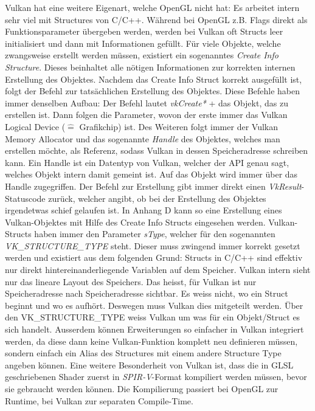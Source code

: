 \documentclass[titlepage, 11pt, a4paper, ngerman]{article}
\begin{document}
Vulkan hat eine weitere Eigenart, welche \acrshort{OpenGL} nicht hat: Es arbeitet intern sehr viel mit Structures von C/C++. Während bei \acrshort{OpenGL} z.B. Flags direkt als Funktionsparameter übergeben werden, werden bei Vulkan oft Structs leer initialisiert und dann mit Informationen gefüllt. Für viele Objekte, welche zwangsweise erstellt werden müssen, existiert ein sogenanntes \textit{Create Info Structure}. Dieses beinhaltet alle nötigen Informationen zur korrekten internen Erstellung des Objektes. Nachdem das Create Info Struct korrekt ausgefüllt ist, folgt der Befehl zur tatsächlichen Erstellung des Objektes. Diese Befehle haben immer denselben Aufbau: Der Befehl lautet \textit{vkCreate*} + das Objekt, das zu erstellen ist. Dann folgen die Parameter, wovon der erste immer das Vulkan Logical Device ($\widehat{=}$ Grafikchip) ist. Des Weiteren folgt immer der Vulkan Memory Allocator und das sogenannte \textit{Handle} des Objektes, welches man erstellen möchte, als Referenz, sodass Vulkan in dessen Speicheradresse schreiben kann. Ein Handle ist ein Datentyp von Vulkan, welcher der \acrshort{API} genau sagt, welches Objekt intern damit gemeint ist.  Auf das Objekt wird immer über das Handle zugegriffen. Der Befehl zur Erstellung gibt immer direkt einen \textit{VkResult}-Statuscode zurück, welcher angibt, ob bei der Erstellung des Objektes irgendetwas schief gelaufen ist. In Anhang D kann so eine Erstellung eines Vulkan-Objektes mit Hilfe des Create Info Structs eingesehen werden. Vulkan-Structs haben immer den Parameter \textit{sType}, welcher für den sogenannten \textit{VK\_STRUCTURE\_TYPE} steht. Dieser muss zwingend immer korrekt gesetzt werden und existiert aus dem folgenden Grund: Structs in C/C++ sind effektiv nur direkt hintereinanderliegende Variablen auf dem Speicher. Vulkan intern sieht nur das lineare Layout des Speichers. Das heisst, für Vulkan ist nur Speicheradresse nach Speicheradresse sichtbar. Es weiss nicht, wo ein Struct beginnt und wo es aufhört. Deswegen muss Vulkan dies mitgeteilt werden. Über den VK\_STRUCTURE\_TYPE weiss Vulkan um was für ein Objekt/Struct es sich handelt. Ausserdem können Erweiterungen so einfacher in Vulkan integriert werden, da diese dann keine Vulkan-Funktion komplett neu definieren müssen, sondern einfach ein Alias des Structures mit einem andere Structure Type angeben können. Eine weitere Besonderheit von Vulkan ist, dass die in \acrshort{GLSL} geschriebenen \gls{Shader} zuerst in \textit{SPIR-V}-Format kompiliert werden müssen, bevor sie gebraucht werden können. Die Kompilierung passiert bei \acrshort{OpenGL} zur Runtime, bei Vulkan zur separaten Compile-Time.
\end{document}
